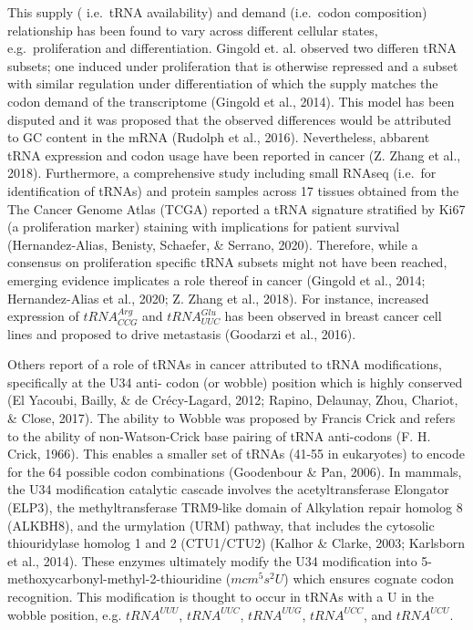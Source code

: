 \documentclass[12pt,openany]{book}
\begin{document}
This supply ( i.e.~tRNA availability) and demand (i.e.~codon
composition) relationship has been found to vary across different
cellular states, e.g.~proliferation and differentiation. Gingold et. al.
observed two differen tRNA subsets; one induced under proliferation that
is otherwise repressed and a subset with similar regulation under
differentiation of which the supply matches the codon demand of the
transcriptome (Gingold et al., 2014). This model has been disputed and
it was proposed that the observed differences would be attributed to GC
content in the mRNA (Rudolph et al., 2016). Nevertheless, abbarent tRNA
expression and codon usage have been reported in cancer (Z. Zhang et
al., 2018). Furthermore, a comprehensive study including small RNAseq
(i.e.~for identification of tRNAs) and protein samples across 17 tissues
obtained from the The Cancer Genome Atlas (TCGA) reported a tRNA
signature stratified by Ki67 (a proliferation marker) staining with
implications for patient survival (Hernandez-Alias, Benisty, Schaefer,
\& Serrano, 2020). Therefore, while a consensus on proliferation
specific tRNA subsets might not have been reached, emerging evidence
implicates a role thereof in cancer (Gingold et al., 2014;
Hernandez-Alias et al., 2020; Z. Zhang et al., 2018). For instance,
increased expression of \(tRNA_{CCG}^{Arg}\) and \(tRNA_{UUC}^{Glu}\)
has been observed in breast cancer cell lines and proposed to drive
metastasis (Goodarzi et al., 2016).

Others report of a role of tRNAs in cancer attributed to tRNA
modifications, specifically at the U34 anti- codon (or wobble) position
which is highly conserved (El Yacoubi, Bailly, \& de Crécy-Lagard, 2012;
Rapino, Delaunay, Zhou, Chariot, \& Close, 2017). The ability to Wobble
was proposed by Francis Crick and refers to the ability of
non-Watson-Crick base pairing of tRNA anti-codons (F. H. Crick, 1966).
This enables a smaller set of tRNAs (41-55 in eukaryotes) to encode for
the 64 possible codon combinations (Goodenbour \& Pan, 2006). In
mammals, the U34 modification catalytic cascade involves the
acetyltransferase Elongator (ELP3), the methyltransferase TRM9-like
domain of Alkylation repair homolog 8 (ALKBH8), and the urmylation (URM)
pathway, that includes the cytosolic thiouridylase homolog 1 and 2
(CTU1/CTU2) (Kalhor \& Clarke, 2003; Karlsborn et al., 2014). These
enzymes ultimately modify the U34 modification into
5-methoxycarbonyl-methyl-2-thiouridine (\(mcm^5s^2U\)) which ensures
cognate codon recognition. This modification is thought to occur in
tRNAs with a U in the wobble position, e.g. \(tRNA^{UUU}\),
\(tRNA^{UUC}\), \(tRNA^{UUG}\), \(tRNA^{UCC}\), and \(tRNA^{UCU}\).
\end{document}
